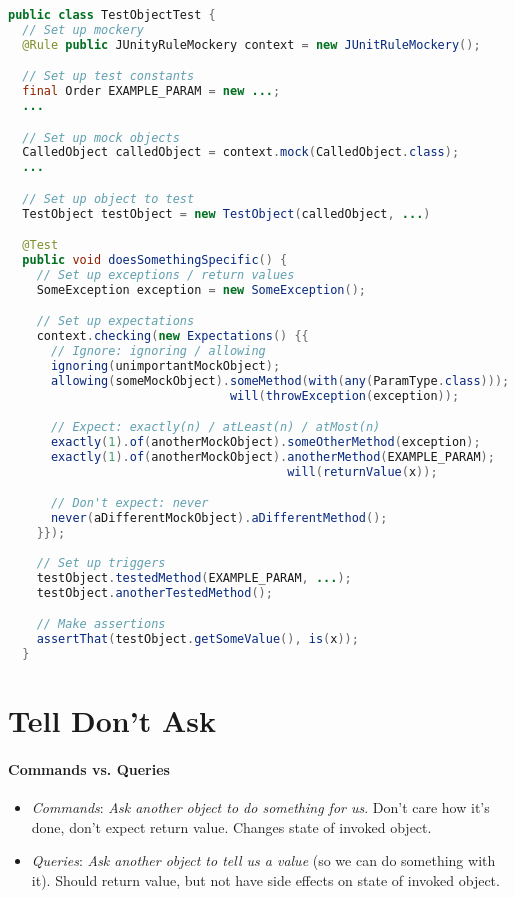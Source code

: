 \documentclass[twocolumn,english]{article}
\begin{document}
\begin{lstlisting}[language=Java,basicstyle={\footnotesize\ttfamily}]
public class TestObjectTest {
  // Set up mockery
  @Rule public JUnityRuleMockery context = new JUnitRuleMockery();

  // Set up test constants
  final Order EXAMPLE_PARAM = new ...;
  ...

  // Set up mock objects
  CalledObject calledObject = context.mock(CalledObject.class);
  ...

  // Set up object to test
  TestObject testObject = new TestObject(calledObject, ...)

  @Test
  public void doesSomethingSpecific() {
    // Set up exceptions / return values
    SomeException exception = new SomeException();

    // Set up expectations
    context.checking(new Expectations() {{
      // Ignore: ignoring / allowing
      ignoring(unimportantMockObject);
      allowing(someMockObject).someMethod(with(any(ParamType.class)));
                               will(throwException(exception));

      // Expect: exactly(n) / atLeast(n) / atMost(n)
      exactly(1).of(anotherMockObject).someOtherMethod(exception);
      exactly(1).of(anotherMockObject).anotherMethod(EXAMPLE_PARAM);
                                       will(returnValue(x));

      // Don't expect: never
      never(aDifferentMockObject).aDifferentMethod();
    }});
    
    // Set up triggers
    testObject.testedMethod(EXAMPLE_PARAM, ...);
    testObject.anotherTestedMethod();

    // Make assertions
    assertThat(testObject.getSomeValue(), is(x));
  }
\end{lstlisting}

\section{Tell Don't Ask}

\paragraph{Commands vs. Queries}
\begin{itemize}
\item \emph{Commands}:\emph{ Ask another object to do something for us}.
Don't care how it's done, don't expect return value. Changes state
of invoked object.
\item \emph{Queries}:\emph{ Ask another object to tell us a value} (so we
can do something with it). Should return value, but not have side
effects on state of invoked object.
\end{itemize}
\end{document}
